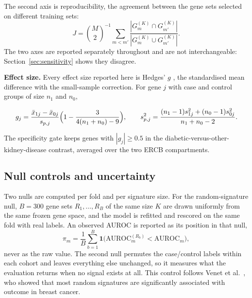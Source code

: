 \documentclass[pdflatex,sn-vancouver-num]{sn-jnl}
\theoremstyle{thmstyleone}
\theoremstyle{thmstyletwo}
\theoremstyle{thmstylethree}
\begin{document}
The second axis is reproducibility, the agreement between the gene sets selected on different training sets:
\begin{equation}
J = \binom{M}{2}^{-1} \sum_{m < m'}
\frac{|G_m^{(K)} \cap G_{m'}^{(K)}|}{|G_m^{(K)} \cup G_{m'}^{(K)}|} .
\label{eq:jaccard}
\end{equation}
The two axes are reported separately throughout and are not interchangeable: Section~\ref{sec:sensitivity} shows they disagree.

\textbf{Effect size.} Every effect size reported here is Hedges' $g$ \cite{hedges1981}, the standardised
mean difference with the small-sample correction. For gene $j$ with case and control
groups of size $n_1$ and $n_0$,

\begin{equation}
g_j = \frac{\bar{x}_{1j} - \bar{x}_{0j}}{s_{p,j}} \Bigl( 1 - \frac{3}{4(n_1 + n_0) - 9} \Bigr) , \qquad
s_{p,j}^{2} = \frac{(n_1 - 1) s_{1j}^{2} + (n_0 - 1) s_{0j}^{2}}{n_1 + n_0 - 2} .
\label{eq:hedges}
\end{equation}

The specificity gate keeps genes with $|g_j| \ge 0.5$ in the diabetic-versus-other-
kidney-disease contrast, averaged over the two ERCB compartments.

\subsection{Null controls and uncertainty}\label{sec:nulls}

Two nulls are computed per fold and per signature size. For the random-signature null, $B = 300$ gene sets $R_1,\dots,R_B$ of the same size $K$ are drawn uniformly from the same frozen gene space, and the model is refitted and rescored on the same fold with real labels. An observed AUROC is reported as its position in that null,
\begin{equation}
\pi_m = \frac{1}{B} \sum_{b=1}^{B}
\mathbf{1}\bigl( \mathrm{AUROC}_m^{(R_b)} < \mathrm{AUROC}_m \bigr) ,
\label{eq:percentile}
\end{equation}
never as the raw value. The second null permutes the case/control labels within each cohort and leaves everything else unchanged, so it measures what the evaluation returns when no signal exists at all. This control follows Venet et al.\ \cite{venet2011}, who showed that most random signatures are significantly associated with outcome in breast cancer.
\end{document}
